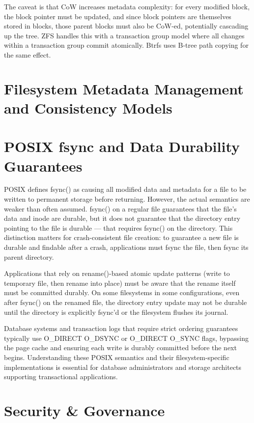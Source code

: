 The caveat is that CoW increases metadata complexity: for every modified block, the block pointer must be updated, and since block pointers are themselves stored in blocks, those parent blocks must also be CoW-ed, potentially cascading up the tree. ZFS handles this with a transaction group model where all changes within a transaction group commit atomically. Btrfs uses B-tree path copying for the same effect.

\section{Filesystem Metadata Management and Consistency Models}
\section{POSIX fsync and Data Durability Guarantees}
POSIX defines fsync() as causing all modified data and metadata for a file to be written to permanent storage before returning. However, the actual semantics are weaker than often assumed. fsync() on a regular file guarantees that the file's data and inode are durable, but it does not guarantee that the directory entry pointing to the file is durable --- that requires fsync() on the directory. This distinction matters for crash-consistent file creation: to guarantee a new file is durable and findable after a crash, applications must fsync the file, then fsync its parent directory.

Applications that rely on rename()-based atomic update patterns (write to temporary file, then rename into place) must be aware that the rename itself must be committed durably. On some filesystems in some configurations, even after fsync() on the renamed file, the directory entry update may not be durable until the directory is explicitly fsync'd or the filesystem flushes its journal.

Database systems and transaction logs that require strict ordering guarantees typically use O\_DIRECT \textbar{} O\_DSYNC or O\_DIRECT \textbar{} O\_SYNC flags, bypassing the page cache and ensuring each write is durably committed before the next begins. Understanding these POSIX semantics and their filesystem-specific implementations is essential for database administrators and storage architects supporting transactional applications.

\section{Security \& Governance}
